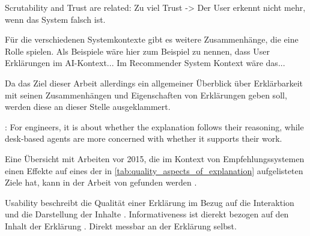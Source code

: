 Scrutability and Trust are related: Zu viel Trust -> Der User erkennt nicht mehr, wenn das System falsch ist. \cite{gunning2019darpa}

Für die verschiedenen Systemkontexte gibt es weitere Zusammenhänge, die eine Rolle spielen. Als Beispiele wäre hier zum Beispiel zu nennen, dass User Erklärungen im AI-Kontext... Im Recommender System Kontext wäre das...

Da das Ziel dieser Arbeit allerdings ein allgemeiner Überblick über Erklärbarkeit mit seinen Zusammenhängen und Eigenschaften von Erklärungen geben soll, werden diese an dieser Stelle ausgeklammert.

\cite{martin_evaluating_2021}: For engineers, it is about whether the explanation follows their reasoning, while desk-based agents are more concerned with whether it supports their work.

Eine Übersicht mit Arbeiten vor 2015, die im Kontext von Empfehlungssystemen einen Effekte auf eines der in \autoref{tab:quality_aspects_of_explanation} aufgelisteten Ziele hat, kann in der Arbeit von \citeauthor{nunes_systematic_2017} gefunden werden \cite{nunes_systematic_2017}.

Usability beschreibt die Qualität einer Erklärung im Bezug auf die Interaktion und die Darstellung der Inhalte \cite{chazette_end-users_nodate}. Informativeness ist dierekt bezogen auf den Inhalt der Erklärung \cite{chazette_end-users_nodate}. Direkt messbar an der Erklärung selbst.